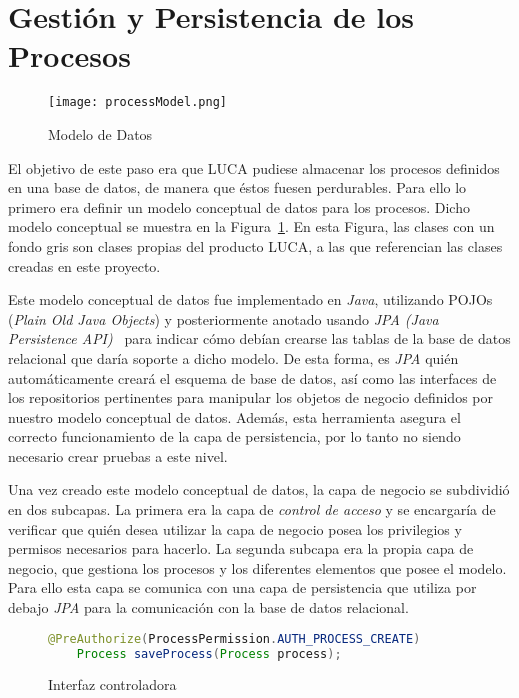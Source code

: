 \section{Gestión y Persistencia de los Procesos}

\begin{figure}[H]
	\centering
	\texttt{[image: processModel.png]}
	\caption{Modelo de Datos}
	\label{fig:processModel}
\end{figure}

El objetivo de este paso era que LUCA pudiese almacenar los procesos definidos en una base de datos, de manera que éstos fuesen perdurables. Para ello lo primero era definir un modelo conceptual de datos para los procesos. Dicho modelo conceptual se muestra en la Figura~\ref{fig:processModel}. En esta Figura, las clases con un fondo gris son clases propias del producto LUCA, a las que referencian las clases creadas  en este proyecto.

Este modelo conceptual de datos fue implementado en \emph{Java}, utilizando POJOs (\emph{Plain Old Java Objects}) y posteriormente anotado usando \emph{JPA (Java Persistence API)}~\cite{jpa} para indicar cómo debían crearse las tablas de la base de datos relacional que daría soporte a dicho modelo. De esta forma, es \emph{JPA} quién automáticamente creará el esquema de base de datos, así como las interfaces de los repositorios pertinentes para manipular los objetos de negocio definidos por nuestro modelo conceptual de datos. Además, esta herramienta asegura el correcto funcionamiento de la capa de persistencia, por lo tanto no siendo necesario crear pruebas a este nivel.

Una vez creado este modelo conceptual de datos, la capa de negocio se subdividió en dos subcapas. La primera era la capa de \emph{control de acceso} y se encargaría de verificar que quién desea utilizar la capa de negocio posea los privilegios y permisos necesarios para hacerlo. La segunda subcapa era la propia capa de negocio, que gestiona los procesos y los diferentes elementos que posee el modelo. Para ello esta capa se comunica con una capa de persistencia que utiliza por debajo \emph{JPA} para la comunicación con la base de datos relacional.

\begin{figure}[H]
	\centering
	\begin{lstlisting}[language=Java]
	@PreAuthorize(ProcessPermission.AUTH_PROCESS_CREATE)
	Process saveProcess(Process process);\end{lstlisting}
	\caption{Interfaz controladora}
	\label{fig:interfazControladora}
\end{figure}

